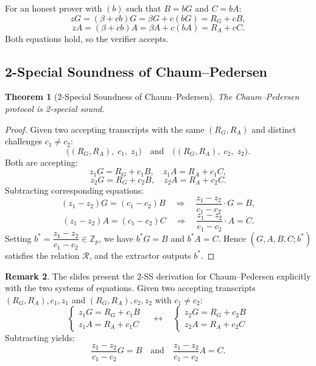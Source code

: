 \documentclass[11pt]{article}
\theoremstyle{plain}
\newtheorem{theorem}{Theorem}[section]
\theoremstyle{definition}
\newtheorem{remark}[theorem]{Remark}
\newcommand{\Zp}{\mathbb{Z}_p}
\begin{document}
For an honest prover with $(b)$ such that $B = bG$ and $C = bA$:
\[
  zG = (\beta + cb)G = \beta G + c(bG) = R_G + cB,
\]
\[
  zA = (\beta + cb)A = \beta A + c(bA) = R_A + cC.
\]
Both equations hold, so the verifier accepts.

\subsection{2-Special Soundness of Chaum--Pedersen}

\begin{theorem}[2-Special Soundness of Chaum--Pedersen]
The Chaum--Pedersen protocol is 2-special sound.
\end{theorem}

\begin{proof}
Given two accepting transcripts with the same $(R_G, R_A)$ and distinct challenges $c_1 \neq c_2$:
\[
  \bigl((R_G, R_A),\; c_1,\; z_1\bigr) \quad \text{and} \quad \bigl((R_G, R_A),\; c_2,\; z_2\bigr).
\]
Both are accepting:
\[
  z_1 G = R_G + c_1 B, \quad z_1 A = R_A + c_1 C,
\]
\[
  z_2 G = R_G + c_2 B, \quad z_2 A = R_A + c_2 C.
\]
Subtracting corresponding equations:
\[
  (z_1 - z_2)G = (c_1 - c_2)B \quad \Longrightarrow \quad \frac{z_1 - z_2}{c_1 - c_2}\cdot G = B,
\]
\[
  (z_1 - z_2)A = (c_1 - c_2)C \quad \Longrightarrow \quad \frac{z_1 - z_2}{c_1 - c_2}\cdot A = C.
\]
Setting $b^* = \dfrac{z_1 - z_2}{c_1 - c_2} \in \Zp$, we have $b^*G = B$ and $b^*A = C$. Hence $(G, A, B, C; b^*)$ satisfies the relation $\mathcal{R}$, and the extractor outputs $b^*$.
\end{proof}

\begin{remark}
The slides present the 2-SS derivation for Chaum--Pedersen explicitly with the two systems of equations. Given two accepting transcripts $(R_G, R_A), c_1, z_1$ and $(R_G, R_A), c_2, z_2$ with $c_1 \neq c_2$:
\[
  \begin{cases}
    z_1 G = R_G + c_1 B\\
    z_1 A = R_A + c_1 C
  \end{cases}
  \quad\longleftrightarrow\quad
  \begin{cases}
    z_2 G = R_G + c_2 B\\
    z_2 A = R_A + c_2 C
  \end{cases}
\]
Subtracting yields:
\[
  \frac{z_1 - z_2}{c_1 - c_2} G = B \quad \text{and} \quad \frac{z_1 - z_2}{c_1 - c_2} A = C.
\]
\end{remark}

\end{document}
